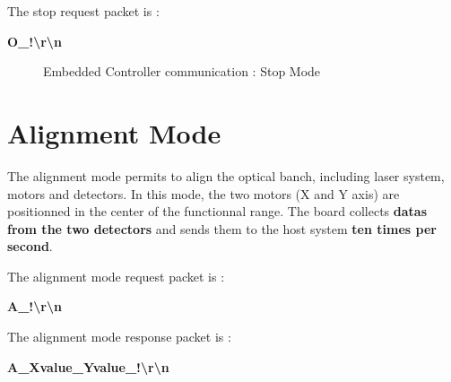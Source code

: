 \documentclass[14pt,fleqn]{book} %
\begin{document}
The stop request packet is : 

\begin{center}
\textbf{\color{blue}\large O\_!\textbackslash{}r\textbackslash{}n}
\end{center}


\begin{figure}[h!]
\centering
{}
\caption{Embedded Controller communication : Stop Mode} \label{fig:rs232_alignment_mode}
\end{figure}

\section{Alignment Mode}

The alignment mode permits to align the optical banch, including laser system, motors and detectors. In this mode, the two motors (X and Y axis) are positionned in the center of the functionnal range. The board collects \textbf{datas from the two detectors} and sends them to the host system \textbf{ten times per second}.

\medskip

The alignment mode request packet is : 

\begin{center}
\textbf{\color{blue}\large A\_!\textbackslash{}r\textbackslash{}n}
\end{center}

The alignment mode response packet is : 

\begin{center}
\textbf{\color{orange}\large A\_Xvalue\_Yvalue\_!\textbackslash{}r\textbackslash{}n}
\end{center}
\end{document}
